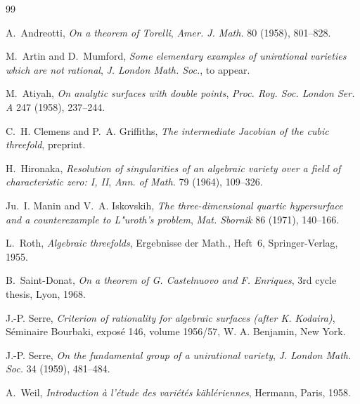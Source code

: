 \documentclass[12pt]{amsart}
\theoremstyle{plain}
\theoremstyle{definition}
\theoremstyle{remark}
\begin{document}
\begin{thebibliography}{99}

 A.~Andreotti, \emph{On a theorem of Torelli}, \textit{Amer. J. Math.}
80 (1958), 801--828.

 M.~Artin and D.~Mumford, \emph{Some elementary examples of unirational
varieties which are not rational}, \textit{J. London Math. Soc.}, to appear.

 M.~Atiyah, \emph{On analytic surfaces with double points},
\textit{Proc. Roy. Soc. London Ser. A} 247 (1958), 237--244.

 C.~H. Clemens and P.~A. Griffiths, \emph{The intermediate Jacobian of
the cubic threefold}, preprint.

 H.~Hironaka, \emph{Resolution of singularities of an algebraic variety over
a field of characteristic zero: I, II}, \textit{Ann. of Math.} 79 (1964), 109--326.

 Ju.~I. Manin and V.~A. Iskovskih, \emph{The three-dimensional quartic
hypersurface and a counterexample to L"uroth's problem}, \textit{Mat. Sbornik}
86 (1971), 140--166.

 L.~Roth, \emph{Algebraic threefolds}, Ergebnisse der Math., Heft~6,
Springer-Verlag, 1955.

 B.~Saint-Donat, \emph{On a theorem of G. Castelnuovo and F. Enriques},
3rd cycle thesis, Lyon, 1968.

 J.-P. Serre, \emph{Criterion of rationality for algebraic surfaces (after
K. Kodaira)}, S\'eminaire Bourbaki, expos\'e 146, volume 1956/57,
W. A. Benjamin, New York.

 J.-P. Serre, \emph{On the fundamental group of a unirational variety},
\textit{J. London Math. Soc.} 34 (1959), 481--484.

 A.~Weil, \emph{Introduction \`a l'\'etude des vari\'et\'es k\"ahl\'eriennes},
Hermann, Paris, 1958.

\end{thebibliography}
\end{document}
